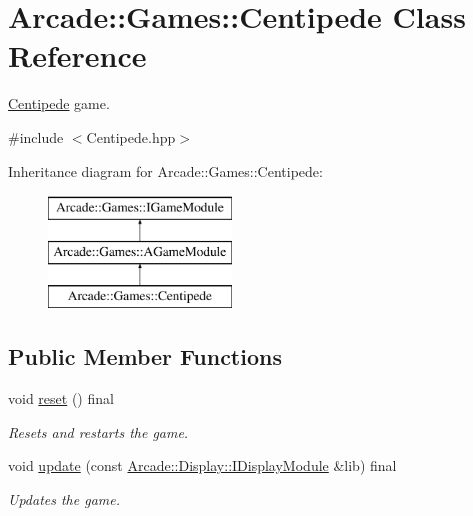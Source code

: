 \hypertarget{classArcade_1_1Games_1_1Centipede}{}\section{Arcade\+::Games\+::Centipede Class Reference}
\label{classArcade_1_1Games_1_1Centipede}


\mbox{\hyperlink{classArcade_1_1Games_1_1Centipede}{Centipede}} game.  




{\ttfamily \#include $<$Centipede.\+hpp$>$}

Inheritance diagram for Arcade\+::Games\+::Centipede\+:\begin{figure}[H]
\begin{center}
\leavevmode
\includegraphics[height=3.000000cm]{classArcade_1_1Games_1_1Centipede}
\end{center}
\end{figure}
\subsection*{Public Member Functions}
\begin{DoxyCompactItemize}
\item 
\mbox{\label{classArcade_1_1Games_1_1Centipede_af32b470589322a425db91cf61d5d5c18}} 
void \mbox{\hyperlink{classArcade_1_1Games_1_1Centipede_af32b470589322a425db91cf61d5d5c18}{reset}} () final
\begin{DoxyCompactList}\small\item\em Resets and restarts the game. \end{DoxyCompactList}\item 
void \mbox{\hyperlink{classArcade_1_1Games_1_1Centipede_a11a932a0abda301ae6037c6b97532e79}{update}} (const \mbox{\hyperlink{classArcade_1_1Display_1_1IDisplayModule}{Arcade\+::\+Display\+::\+I\+Display\+Module}} \&lib) final
\begin{DoxyCompactList}\small\item\em Updates the game. \end{DoxyCompactList}\end{DoxyCompactItemize}
